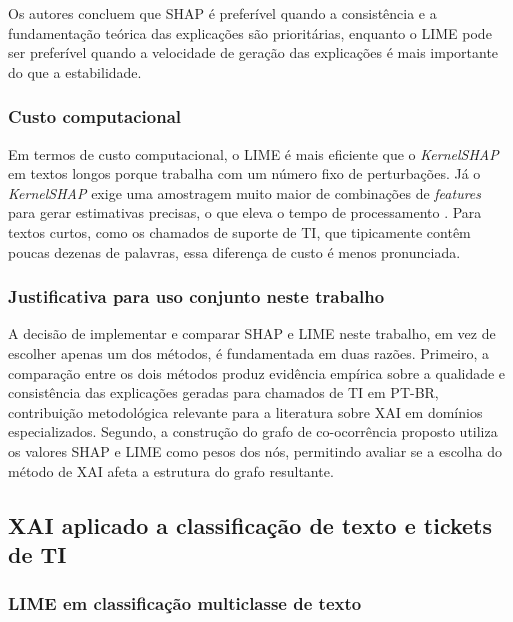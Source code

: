 \documentclass[
    12pt,                %
    openright,           %
    oneside,             %
    a4paper,             %
    english,             %
    brazil               %
]{abntex2}
\begin{document}
Os autores concluem que SHAP é preferível quando a consistência e a fundamentação teórica das explicações são prioritárias, enquanto o LIME pode ser preferível quando a velocidade de geração das explicações é mais importante do que a estabilidade.

\subsubsection{Custo computacional}
\label{subsubsec:comparacao_custo}

Em termos de custo computacional, o LIME é mais eficiente que o 
\textit{KernelSHAP} em textos longos porque trabalha com um número 
fixo de perturbações. Já o \textit{KernelSHAP} exige uma amostragem 
muito maior de combinações de \textit{features} para gerar estimativas 
precisas, o que eleva o tempo de processamento \cite{salih2023}. 
Para textos curtos, como os chamados de suporte de TI, que tipicamente 
contêm poucas dezenas de palavras, essa diferença de custo é menos 
pronunciada.
\subsubsection{Justificativa para uso conjunto neste trabalho}
\label{subsubsec:comparacao_justificativa}

A decisão de implementar e comparar SHAP e LIME neste trabalho, em vez de escolher apenas um dos métodos, é fundamentada em duas razões. Primeiro, a comparação entre os dois métodos produz evidência empírica sobre a qualidade e consistência das explicações geradas para chamados de TI em PT-BR, contribuição metodológica relevante para a literatura sobre XAI em domínios especializados. Segundo, a construção do grafo de co-ocorrência proposto utiliza os 
valores SHAP e LIME como pesos dos nós, permitindo avaliar 
se a escolha do método de XAI afeta a estrutura do grafo resultante.

\subsection{XAI aplicado a classificação de texto e tickets de TI}
\label{subsec:xai_aplicado}

\subsubsection{LIME em classificação multiclasse de texto}
\label{subsubsec:xai_mustafa}
\end{document}
